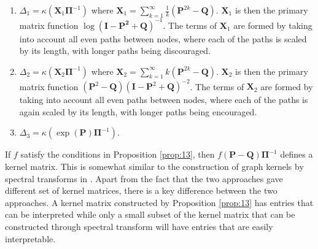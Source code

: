 \begin{enumerate}
\item $\Delta_1 = \kappa(\mathbf{X}_1\bm{\Pi}^{-1})$ where
  $\mathbf{X}_1 = \sum_{k=1}^{\infty}{\tfrac{1}{k}(\mathbf{P}^{2k} -
    \mathbf{Q})}$. $\mathbf{X}_1$ is then the primary matrix function
  $\log{(\mathbf{I} - \mathbf{P^2} + \mathbf{Q})^{-1}}$. The terms of
  $\mathbf{X}_1$ are formed by taking into account all even paths
  between nodes, where each of the paths is scaled by its length, with
  longer paths being discouraged.
\item $\Delta_{2} = \kappa(\mathbf{X}_2\bm{\Pi}^{-1})$ where $\mathbf{X}_2 =
  \sum_{k=1}^{\infty}{k(\mathbf{P}^{2k} - \mathbf{Q})}$. $\mathbf{X}_2$
  is then the primary matrix function $(\mathbf{P}^2 -
  \mathbf{Q})(\mathbf{I} - \mathbf{P}^2 + \mathbf{Q})^{-2}$. The terms
  of $\mathbf{X}_2$ are formed by taking
  into account all even paths between nodes, where each of the paths is
  again scaled by its length, with longer paths being encouraged.
\item $\Delta_{3} = \kappa(\exp(\mathbf{P})\bm{\Pi}^{-1})$. 
\end{enumerate}
%
%
If $f$ satisfy the conditions in Proposition \ref{prop:13}, then
$f(\mathbf{P} - \mathbf{Q})\bm{\Pi}^{-1}$ defines a kernel
matrix. This is somewhat similar to the construction of graph kernels
by spectral transforms in
\citet{zhu05:_semi,chapelle03:_clust_kernel_semi_super_learn,smola03:_kernel}.
Apart from the fact that the two approaches gave different set of
kernel matrices, there is a key difference between the two
approaches. A kernel matrix constructed by Proposition \ref{prop:13}
has entries that can be interpreted while only a small subset of the
kernel matrix that can be constructed through spectral transform will
have entries that are easily interpretable.
